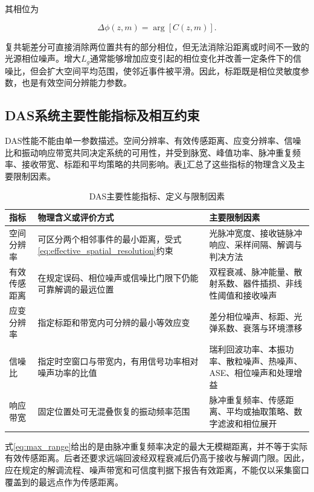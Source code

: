 其相位为

\begin{equation}
\Delta\phi(z,m)
=
\arg\left[C(z,m)\right].
\label{eq:differential_phase}
\end{equation}

复共轭差分可直接消除两位置共有的部分相位，但无法消除沿距离或时间不一致的光源相位噪声。增大$L_g$通常能够增加应变引起的相位变化并改善一定条件下的信噪比，但会扩大空间平均范围，使邻近事件被平滑。因此，标距既是相位灵敏度参数，也是有效空间分辨能力参数\cite{qian2025drift,yang2022digitalized}。

\subsection{DAS系统主要性能指标及相互约束}

DAS性能不能由单一参数描述。空间分辨率、有效传感距离、应变分辨率、信噪比和振动响应带宽共同决定系统的可用性，并受到脉宽、峰值功率、脉冲重复频率、接收带宽、标距和平均策略的共同影响。表\ref{tab:das_performance_metrics}汇总了这些指标的物理含义及主要限制因素。

\begin{table}[htbp]
  \centering
  \caption{DAS主要性能指标、定义与限制因素}
  \label{tab:das_performance_metrics}
  \renewcommand{\arraystretch}{1.22}
  \begin{tabular}{p{}p{}p{}}
    \toprule
    指标 & 物理含义或评价方式 & 主要限制因素 \\
    \midrule
    空间分辨率 & 可区分两个相邻事件的最小距离，受式\eqref{eq:effective_spatial_resolution}约束 & 光脉冲宽度、接收链脉冲响应、采样间隔、解调与判决方法 \\
    有效传感距离 & 在规定误码、相位噪声或信噪比门限下仍能可靠解调的最远位置 & 双程衰减、脉冲能量、散射系数、器件插损、非线性阈值和接收噪声 \\
    应变分辨率 & 指定标距和带宽内可分辨的最小等效应变 & 差分相位噪声、标距、光弹系数、衰落与环境漂移 \\
    信噪比 & 指定时空窗口与带宽内，有用信号功率相对噪声功率的比值 & 瑞利回波功率、本振功率、散粒噪声、热噪声、ASE、相位噪声和处理增益 \\
    响应带宽 & 固定位置处可无混叠恢复的振动频率范围 & 脉冲重复频率、传感距离、平均或抽取策略、数字滤波和相位展开 \\
    \bottomrule
  \end{tabular}
\end{table}

式\eqref{eq:max_range}给出的是由脉冲重复频率决定的最大无模糊距离，并不等于实际有效传感距离。后者还要求远端回波经双程衰减后仍高于接收与解调门限。因此，应在规定的解调流程、噪声带宽和可信度判据下报告有效距离，不能仅以采集窗口覆盖到的最远点作为传感距离。

